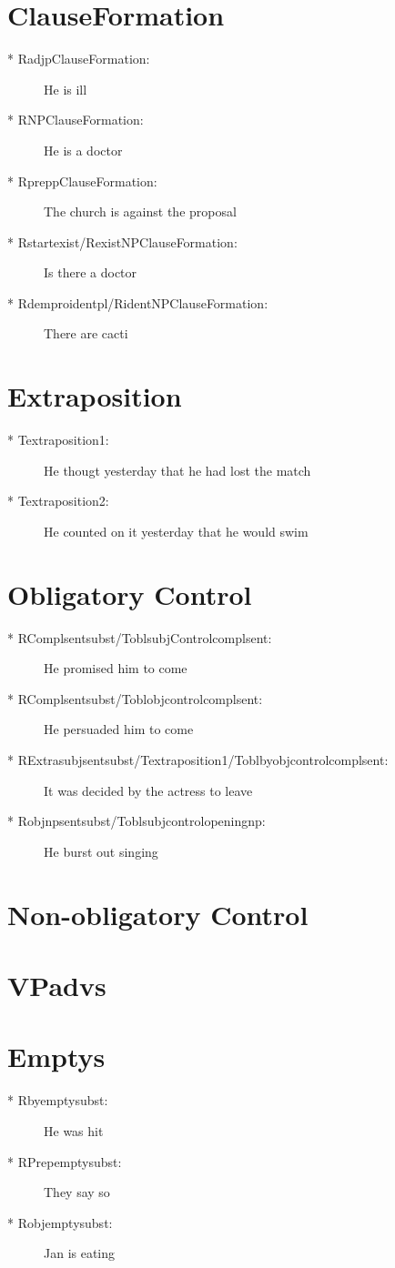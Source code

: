 \section {ClauseFormation}
\begin{description}
\item[* RadjpClauseFormation:] He is ill\\
\item[* RNPClauseFormation:] He is a doctor\\
\item[* RpreppClauseFormation:] The church is against the proposal
\item[* Rstartexist/RexistNPClauseFormation:] Is there a doctor
\item[* Rdemproidentpl/RidentNPClauseFormation:] There are cacti
\end{description}
\section {Extraposition}
\begin{description}
\item[* Textraposition1:] He thougt yesterday that he had lost the match
\item[* Textraposition2:] He counted on it yesterday that he would swim
\end{description}
\section {Obligatory Control}
\begin{description}
\item[* RComplsentsubst/ToblsubjControlcomplsent:] He promised him to come
\item[* RComplsentsubst/Toblobjcontrolcomplsent:] He persuaded him to come
\item[* RExtrasubjsentsubst/Textraposition1/Toblbyobjcontrolcomplsent:] It was 
decided by the actress to leave
\item[* Robjnpsentsubst/Toblsubjcontrolopeningnp:] He burst out singing
\end{description}
\section {Non-obligatory Control}
\section {VPadvs}
\section {Emptys}
\begin{description}
\item[* Rbyemptysubst:] He was hit
\item[* RPrepemptysubst:] They say so
\item[* Robjemptysubst:] Jan is eating
\end{description}
